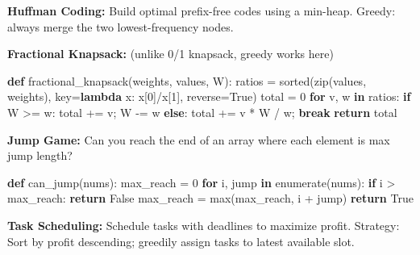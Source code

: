 \documentclass[11pt]{article}
\newenvironment{Shaded}{\begin{snugshade}}{\end{snugshade}}
\newcommand{\BuiltInTok}[1]{\textcolor[rgb]{0.50,0.55,0.55}{#1}}
\newcommand{\ControlFlowTok}[1]{\textcolor[rgb]{0.99,0.74,0.29}{\textbf{#1}}}
\newcommand{\DecValTok}[1]{\textcolor[rgb]{0.96,0.45,0.00}{#1}}
\newcommand{\KeywordTok}[1]{\textcolor[rgb]{0.81,0.81,0.76}{\textbf{#1}}}
\newcommand{\NormalTok}[1]{\textcolor[rgb]{0.81,0.81,0.76}{#1}}
\newcommand{\OperatorTok}[1]{\textcolor[rgb]{0.81,0.81,0.76}{#1}}
\newcommand{\VariableTok}[1]{\textcolor[rgb]{0.15,0.68,0.68}{#1}}
\begin{document}
\textbf{Huffman Coding:} Build optimal prefix-free codes using a min-heap. Greedy: always merge the two lowest-frequency nodes.

\textbf{Fractional Knapsack:} (unlike 0/1 knapsack, greedy works here)


\begin{Shaded}
\begin{Highlighting}[]
\KeywordTok{def}\NormalTok{ fractional\_knapsack(weights, values, W):}
\NormalTok{    ratios }\OperatorTok{=} \BuiltInTok{sorted}\NormalTok{(}\BuiltInTok{zip}\NormalTok{(values, weights), key}\OperatorTok{=}\KeywordTok{lambda}\NormalTok{ x: x[}\DecValTok{0}\NormalTok{]}\OperatorTok{/}\NormalTok{x[}\DecValTok{1}\NormalTok{], reverse}\OperatorTok{=}\VariableTok{True}\NormalTok{)}
\NormalTok{    total }\OperatorTok{=} \DecValTok{0}
    \ControlFlowTok{for}\NormalTok{ v, w }\KeywordTok{in}\NormalTok{ ratios:}
        \ControlFlowTok{if}\NormalTok{ W }\OperatorTok{\textgreater{}=}\NormalTok{ w:}
\NormalTok{            total }\OperatorTok{+=}\NormalTok{ v}\OperatorTok{;}\NormalTok{ W }\OperatorTok{{-}=}\NormalTok{ w}
        \ControlFlowTok{else}\NormalTok{:}
\NormalTok{            total }\OperatorTok{+=}\NormalTok{ v }\OperatorTok{*}\NormalTok{ W }\OperatorTok{/}\NormalTok{ w}\OperatorTok{;} \ControlFlowTok{break}
    \ControlFlowTok{return}\NormalTok{ total}
\end{Highlighting}
\end{Shaded}

\textbf{Jump Game:} Can you reach the end of an array where each element is max jump length?


\begin{Shaded}
\begin{Highlighting}[]
\KeywordTok{def}\NormalTok{ can\_jump(nums):}
\NormalTok{    max\_reach }\OperatorTok{=} \DecValTok{0}
    \ControlFlowTok{for}\NormalTok{ i, jump }\KeywordTok{in} \BuiltInTok{enumerate}\NormalTok{(nums):}
        \ControlFlowTok{if}\NormalTok{ i }\OperatorTok{\textgreater{}}\NormalTok{ max\_reach: }\ControlFlowTok{return} \VariableTok{False}
\NormalTok{        max\_reach }\OperatorTok{=} \BuiltInTok{max}\NormalTok{(max\_reach, i }\OperatorTok{+}\NormalTok{ jump)}
    \ControlFlowTok{return} \VariableTok{True}
\end{Highlighting}
\end{Shaded}

\textbf{Task Scheduling:} Schedule tasks with deadlines to maximize profit.
Strategy: Sort by profit descending; greedily assign tasks to latest available slot.
\end{document}
